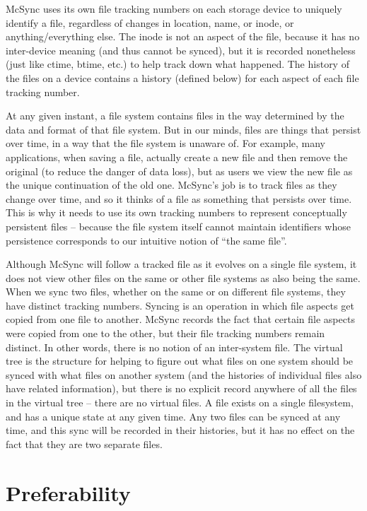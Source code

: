 \documentclass{book}
\begin{document}
McSync uses its own file tracking numbers on each storage device to uniquely identify a file, regardless of changes in location, name, or inode, or anything/everything else.
The inode is not an aspect of the file, because it has no inter-device meaning (and thus cannot be synced), but it is recorded nonetheless (just like ctime, btime, etc.) to help track down what happened.
The history of the files on a device contains a history (defined below) for each aspect of each file tracking number.

At any given instant, a file system contains files in the way determined by the data and format of that file system.  But in our minds, files are things that persist over time, in a way that the file system is unaware of.  For example, many applications, when saving a file, actually create a new file and then remove the original (to reduce the danger of data loss), but as users we view the new file as the unique continuation of the old one.  McSync's job is to track files as they change over time, and so it thinks of a file as something that persists over time.  This is why it needs to use its own tracking numbers to represent conceptually persistent files -- because the file system itself cannot maintain identifiers whose persistence corresponds to our intuitive notion of ``the same file''.

Although McSync will follow a tracked file as it evolves on a single file system, it does not view other files on the same or other file systems as also being the same.  When we sync two files, whether on the same or on different file systems, they have distinct tracking numbers.  Syncing is an operation in which file aspects get copied from one file to another.  McSync records the fact that certain file aspects were copied from one to the other, but their file tracking numbers remain distinct.  In other words, there is no notion of an inter-system file.  The virtual tree is the structure for helping to figure out what files on one system should be synced with what files on another system (and the histories of individual files also have related information), but there is no explicit record anywhere of all the files in the virtual tree -- there are no virtual files.  A file exists on a single filesystem, and has a unique state at any given time.  Any two files can be synced at any time, and this sync will be recorded in their histories, but it has no effect on the fact that they are two separate files.


\section{Preferability}
\end{document}
